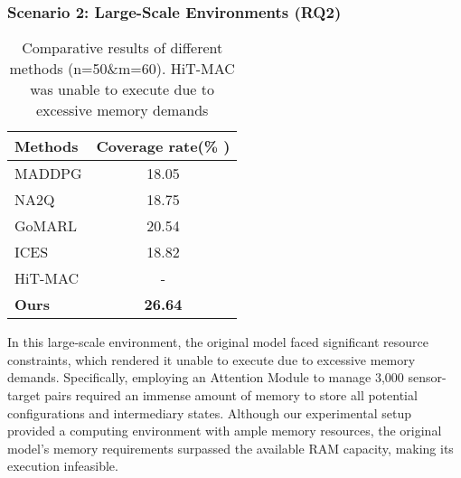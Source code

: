 \documentclass[preprint,12pt]{elsarticle}
\begin{document}


\subsubsection{Scenario 2: Large-Scale Environments (RQ2)}
\begin{table}[ht]
\centering

\begin{tabular}{lc} %
\hline
\textbf{Methods} & \textbf{Coverage rate(\% ) } \\
\hline
MADDPG & 18.05 \\
NA2Q & 18.75 \\
GoMARL   & 20.54 \\
ICES   & 18.82 \\
HiT-MAC   & - \\
\hline
\textbf{Ours} & \textbf{26.64} \\
\hline
\end{tabular}
\caption{Comparative results of different methods (n=50\&m=60). HiT-MAC was  unable to execute due to excessive memory demands}
\end{table}


In this large-scale environment, the original model faced significant resource constraints, which rendered it unable to execute due to excessive memory demands. Specifically, employing an Attention Module to manage 3,000 sensor-target pairs required an immense amount of memory to store all potential configurations and intermediary states. Although our experimental setup provided a computing environment with ample memory resources, the original model's memory requirements surpassed the available RAM capacity, making its execution infeasible.
\end{document}
